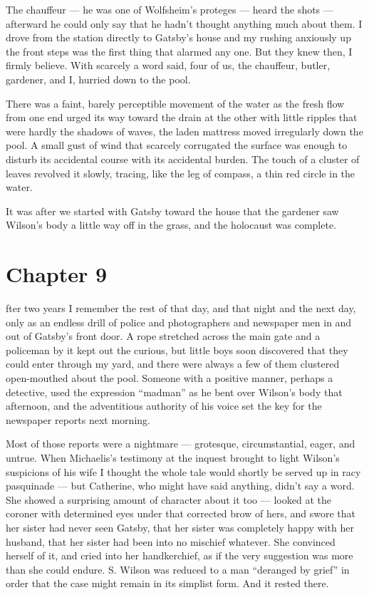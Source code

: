 \documentclass{znotebook}
\begin{document}
The chauffeur ---{} he was one of Wolfsheim's proteges ---{} heard the shots ---{} afterward he could only say that he hadn't thought anything much about them. I drove from the station directly to Gatsby's house and my rushing anxiously up the front steps was the first thing that alarmed any one. But they knew then, I firmly believe. With scarcely a word said, four of us, the chauffeur, butler, gardener, and I, hurried down to the pool.

There was a faint, barely perceptible movement of the water as the fresh flow from one end urged its way toward the drain at the other with little ripples that were hardly the shadows of waves, the laden mattress moved irregularly down the pool. A small gust of wind that scarcely corrugated the surface was enough to disturb its accidental course with its accidental burden. The touch of a cluster of leaves revolved it slowly, tracing, like the leg of compass, a thin red circle in the water.

It was after we started with Gatsby toward the house that the gardener saw Wilson's body a little way off in the grass, and the holocaust was complete.

\chapter{Chapter 9}

\lettrine[findent=2pt]{}{ }fter two years I remember the rest of that day, and that night and the next day, only as an endless drill of police and photographers and newspaper men in and out of Gatsby's front door. A rope stretched across the main gate and a policeman by it kept out the curious, but little boys soon discovered that they could enter through my yard, and there were always a few of them clustered open-mouthed about the pool. Someone with a positive manner, perhaps a detective, used the expression ``madman'' as he bent over Wilson's body that afternoon, and the adventitious authority of his voice set the key for the newspaper reports next morning.

Most of those reports were a nightmare ---{} grotesque, circumstantial, eager, and untrue. When Michaelis's testimony at the inquest brought to light Wilson's suspicions of his wife I thought the whole tale would shortly be served up in racy pasquinade ---{} but Catherine, who might have said anything, didn't say a word. She showed a surprising amount of character about it too ---{} looked at the coroner with determined eyes under that corrected brow of hers, and swore that her sister had never seen Gatsby, that her sister was completely happy with her husband, that her sister had been into no mischief whatever. She convinced herself of it, and cried into her handkerchief, as if the very suggestion was more than she could endure. S. Wilson was reduced to a man ``deranged by grief'' in order that the case might remain in its simplist form. And it rested there.
\end{document}
